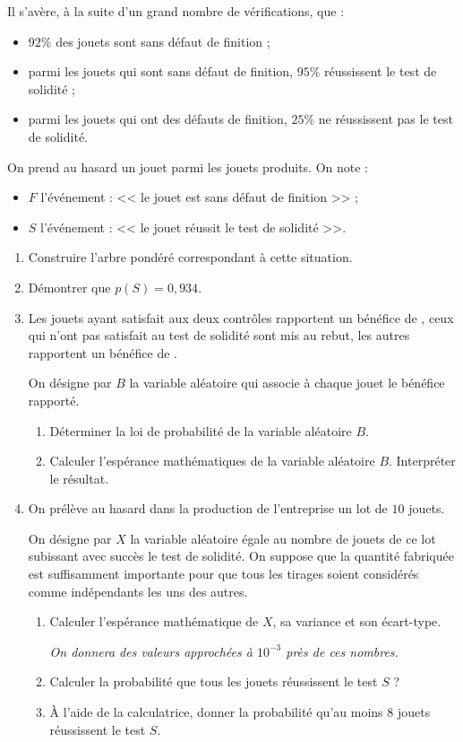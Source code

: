 \documentclass[10pt,openright,twoside,french]{book}
\begin{document}
Il s'avère, à la suite d'un grand nombre de vérifications, que :
\begin{itemize}[label=\textbullet]
    \item $92\%$ des jouets sont sans défaut de finition ;
    \item parmi les jouets qui sont sans défaut de finition, $95\%$ réussissent le test de solidité ;
    \item parmi les jouets qui ont des défauts de finition, $25\%$ ne réussissent pas le test de solidité.
\end{itemize}\medskip

On prend au hasard un jouet parmi les jouets produits. On note :
\begin{itemize}[label=\textbullet]
    \item $F$ l'événement : << le jouet est sans défaut de finition >> ;
    \item $S$ l'événement : << le jouet réussit le test de solidité >>.
\end{itemize}\medskip

\begin{enumerate}
    \item Construire l'arbre pondéré correspondant à cette situation.
    \item Démontrer que $p(S) = 0,934$.
    \item Les jouets ayant satisfait aux deux contrôles rapportent un bénéfice de , ceux qui n'ont pas satisfait au test de solidité sont mis au rebut, les autres rapportent un bénéfice de .\par
        On désigne par $B$ la variable aléatoire qui associe à chaque jouet le bénéfice rapporté.
        \begin{enumerate}
            \item Déterminer la loi de probabilité de la variable aléatoire $B$.
            \item Calculer l'espérance mathématiques de la variable aléatoire $B$. Interpréter le résultat.
        \end{enumerate}
    \item On prélève au hasard dans la production de l'entreprise un lot de $10$ jouets.\par On désigne par $X$ la variable aléatoire égale au nombre de jouets de ce lot subissant avec succès le test de solidité. On suppose que la quantité fabriquée est suffisamment importante pour que tous les tirages soient considérés comme indépendants les uns des autres.
        \begin{enumerate}
            \item Calculer l'espérance mathématique de $X$, sa variance et son écart-type.\par
            \textit{On donnera des valeurs approchées à $10^{-3}$ près de ces nombres.}
            \item Calculer la probabilité que tous les jouets réussissent le test $S$ ?
            \item À l'aide de la calculatrice, donner la probabilité qu'au moins $8$ jouets réussissent le test $S$.
        \end{enumerate}
\end{enumerate}
\end{document}
